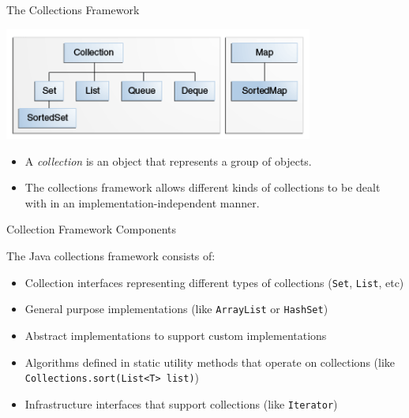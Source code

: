 \documentclass{beamer}
\begin{document}
\begin{frame}
  \titlepage
\end{frame}

\begin{frame}[fragile]{The Collections Framework}

\begin{center}
\includegraphics[width=4in]{colls-coreInterfaces.png}
\end{center}

\begin{itemize}
\item A {\it collection} is an object that represents a group of objects.
\item The collections framework allows different kinds of collections to be dealt with in an implementation-independent manner.
\end{itemize}


\end{frame}

\begin{frame}[fragile]{Collection Framework Components}

The Java collections framework consists of:
\begin{itemize}
\item Collection interfaces representing different types of collections ({\tt Set}, {\tt List}, etc)
\item General purpose implementations (like {\tt ArrayList} or {\tt HashSet})
\item Abstract implementations to support custom implementations
\item Algorithms defined in static utility methods that operate on collections (like {\tt Collections.sort(List<T> list)})
\item Infrastructure interfaces that support collections (like {\tt Iterator})
\end{itemize}

\end{frame}
\end{document}
